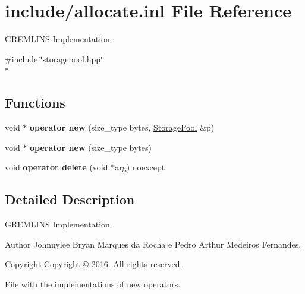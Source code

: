 \hypertarget{allocate_8inl}{}\section{include/allocate.inl File Reference}
\label{allocate_8inl}


G\+R\+E\+M\+L\+I\+NS Implementation.  


{\ttfamily \#include \char`\"{}storagepool.\+hpp\char`\"{}}\\*
\subsection*{Functions}
\begin{DoxyCompactItemize}
\item 
void $\ast$ {\bfseries operator new} (size\+\_\+type bytes, \hyperlink{class_storage_pool}{Storage\+Pool} \&p)\hypertarget{allocate_8inl_af955c2484913d10f828dd418b7c8ebeb}{}\label{allocate_8inl_af955c2484913d10f828dd418b7c8ebeb}

\item 
void $\ast$ {\bfseries operator new} (size\+\_\+type bytes)\hypertarget{allocate_8inl_aa886d6c22d8dd32cccaf0a2fc2aea2a2}{}\label{allocate_8inl_aa886d6c22d8dd32cccaf0a2fc2aea2a2}

\item 
void {\bfseries operator delete} (void $\ast$arg) noexcept\hypertarget{allocate_8inl_a49aeafb236d8e2fa3f1b687b6e0122db}{}\label{allocate_8inl_a49aeafb236d8e2fa3f1b687b6e0122db}

\end{DoxyCompactItemize}


\subsection{Detailed Description}
G\+R\+E\+M\+L\+I\+NS Implementation. 

\begin{DoxyAuthor}{Author}
Johnnylee Bryan Marques da Rocha e Pedro Arthur Medeiros Fernandes. 
\end{DoxyAuthor}
\begin{DoxyCopyright}{Copyright}
Copyright \copyright{} 2016. All rights reserved.
\end{DoxyCopyright}
File with the implementations of new operators. 